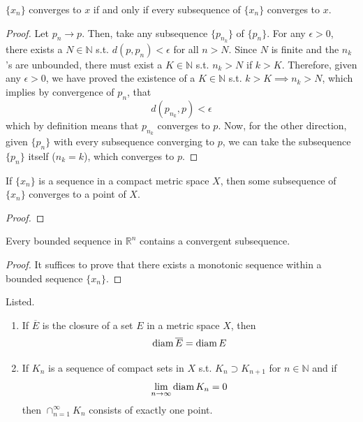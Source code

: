   \begin{lemma}
    $\{x_n\}$ converges to $x$ if and only if every subsequence of $\{x_n\}$ converges to $x$. 
  \end{lemma}
  \begin{proof}
    Let $p_n \rightarrow p$. Then, take any subsequence $\{p_{n_k}\}$ of $\{p_n\}$. For any $\epsilon > 0$, there exists a $N \in \mathbb{N}$ s.t. $d(p, p_n) < \epsilon$ for all $n > N$. Since $N$ is finite and the $n_k$'s are unbounded, there must exist a $K \in \mathbb{N}$ s.t. $n_k > N$ if $k > K$. Therefore, given any $\epsilon > 0$, we have proved the existence of a $K \in \mathbb{N}$ s.t. $k > K \implies n_k > N$, which implies by convergence of $p_n$, that 
    \begin{equation}
      d(p_{n_k}, p) < \epsilon
    \end{equation}
    which by definition means that $p_{n_k}$ converges to $p$. Now, for the other direction, given $\{p_n\}$ with every subsequence converging to $p$, we can take the subsequence $\{p_n\}$ itself ($n_k = k$), which converges to $p$. 
  \end{proof}

  \begin{theorem}
    If $\{x_n\}$ is a sequence in a compact metric space $X$, then some subsequence of $\{x_n\}$ converges to a point of $X$.  
  \end{theorem}
  \begin{proof}
    
  \end{proof}

  \begin{corollary}
    Every bounded sequence in $\mathbb{R}^n$ contains a convergent subsequence. 
  \end{corollary} 
  \begin{proof}
    It suffices to prove that there exists a monotonic sequence within a bounded sequence $\{x_n\}$. 
  \end{proof}

  \begin{theorem}
    Listed. 
    \begin{enumerate}
      \item If $\overline{E}$ is the closure of a set $E$ in a metric space $X$, then 
      \[\operatorname{diam}{\overline{E}} = \operatorname{diam}{E}\]

      \item If $K_n$ is a sequence of compact sets in $X$ s.t. $K_n \supset K_{n+1}$ for $n \in \mathbb{N}$ and if 
      \[\lim_{n \rightarrow \infty} \operatorname{diam}{K_n} = 0\]
      then $\cap_{n=1}^\infty K_n$ consists of exactly one point. 
    \end{enumerate}
  \end{theorem}

